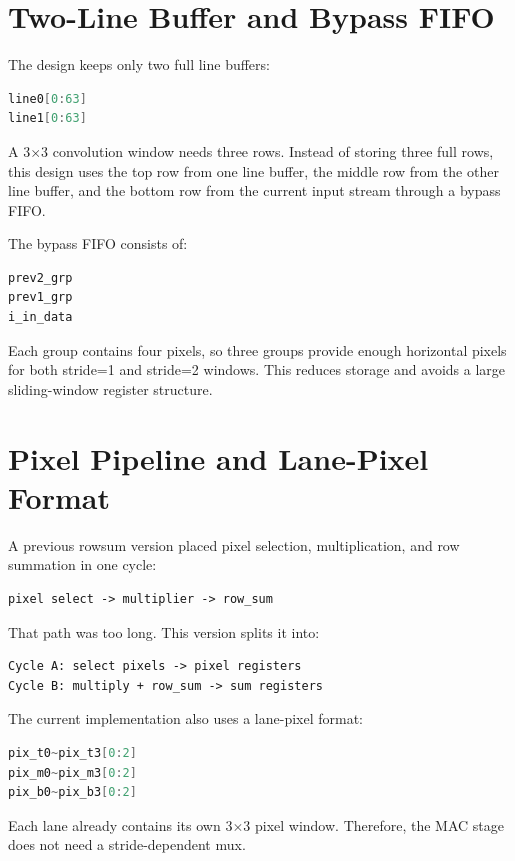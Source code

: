 \documentclass[11pt]{article}
\begin{document}
\section*{Two-Line Buffer and Bypass FIFO}

The design keeps only two full line buffers:

\begin{lstlisting}[language=Verilog]
line0[0:63]
line1[0:63]
\end{lstlisting}

A 3$\times$3 convolution window needs three rows. Instead of storing three full rows, this design uses the top row from one line buffer, the middle row from the other line buffer, and the bottom row from the current input stream through a bypass FIFO.

The bypass FIFO consists of:

\begin{lstlisting}[language=Verilog]
prev2_grp
prev1_grp
i_in_data
\end{lstlisting}

Each group contains four pixels, so three groups provide enough horizontal pixels for both stride=1 and stride=2 windows. This reduces storage and avoids a large sliding-window register structure.

\section*{Pixel Pipeline and Lane-Pixel Format}

A previous rowsum version placed pixel selection, multiplication, and row summation in one cycle:

\begin{lstlisting}
pixel select -> multiplier -> row_sum
\end{lstlisting}

That path was too long. This version splits it into:

\begin{lstlisting}
Cycle A: select pixels -> pixel registers
Cycle B: multiply + row_sum -> sum registers
\end{lstlisting}

The current implementation also uses a lane-pixel format:

\begin{lstlisting}[language=Verilog]
pix_t0~pix_t3[0:2]
pix_m0~pix_m3[0:2]
pix_b0~pix_b3[0:2]
\end{lstlisting}

Each lane already contains its own 3$\times$3 pixel window. Therefore, the MAC stage does not need a stride-dependent mux.
\end{document}
